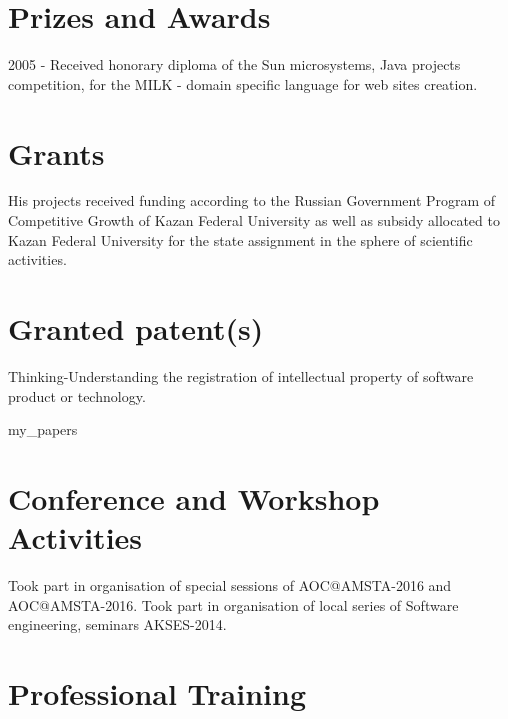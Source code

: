\documentclass{moderncv}
\begin{document}
\section{Prizes and Awards}

2005 - Received honorary diploma of the Sun microsystems, Java projects competition, for the MILK - domain specific language for web sites creation.

\section{Grants}

His projects received funding according to the Russian Government Program of Competitive Growth of Kazan Federal University as well as subsidy allocated to Kazan Federal University for the state assignment in the sphere of scientific activities.

\section{Granted patent(s)}

Thinking-Understanding the registration of intellectual property of software product or technology.

\begin{btSect}[unsrtnat]{my_papers}
\btPrintNotCited
\end{btSect}

\cvitem{}{}

\section{Conference and Workshop Activities}


Took part in organisation of special sessions of AOC@AMSTA-2016 and AOC@AMSTA-2016.
Took part in organisation of local series of Software engineering, seminars AKSES-2014.

\section{Professional Training}
\end{document}
